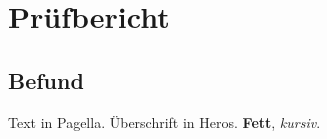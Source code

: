 \documentclass[a4paper,11pt,parskip=half]{scrreprt}
\begin{document}
\chapter{Prüfbericht}
\section{Befund}
Text in Pagella. \textsf{Überschrift in Heros.} \textbf{Fett}, \textit{kursiv}.
\end{document}
